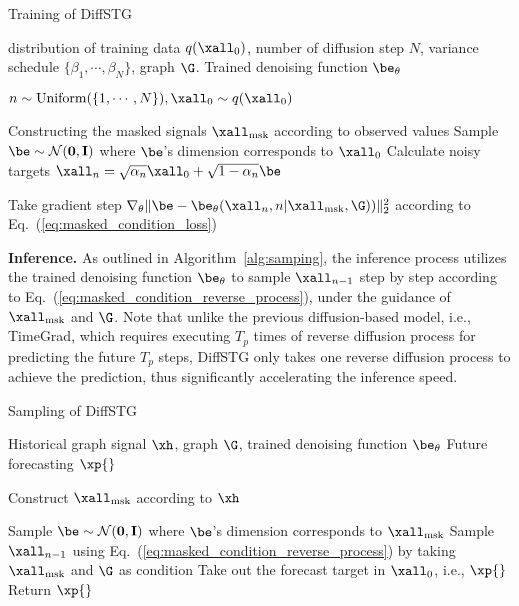 {  
\renewcommand{\algorithmicrequire}{\textbf{Input:}}  
\renewcommand{\algorithmicensure}{\textbf{Output:}} 
\begin{algorithm}[htbp]
   \caption{Training of DiffSTG}
   \small
\begin{algorithmic}[1]
   \Require distribution of training data $q(\xall_0)$, number of diffusion step $N$, variance schedule $\{\beta_1, \cdots, \beta_N \}$,  graph  $\G$.
   \Ensure Trained denoising function $\be_{\theta}$ 

   \Repeat
   \State $n \sim {\rm Uniform}(\{ 1, \cdots, N\}), \xall_{0} \sim q(\xall_0)$
   
    \State Constructing the masked signals $\xall_{\rm msk}$ according to observed values
   \State Sample $\be \sim {\mathcal{N}}(\mathbf{0}, \mathbf{I})$ where $\be$'s dimension corresponds to $\xall_{0}$
   \State Calculate noisy targets $\xall_{n}=\sqrt{\alpha_n}\xall_{0} + \sqrt{1 - \alpha_n }\be$

   \State Take gradient step  $\nabla_\theta  \| \be- \be_\theta(\xall_{n}, n | \xall_{\rm msk}, \G) )\|_2^2$ according to Eq.~(\ref{eq:masked_condition_loss})
\end{algorithmic}
\label{alg:training}
\end{algorithm}

\par \textbf{Inference.} As outlined in Algorithm~\ref{alg:samping}, the inference process  utilizes the trained denoising function $\be_{\theta}$ to sample $\xall_{n-1}$ step by step according to Eq.~(\ref{eq:masked_condition_reverse_process}), under the guidance of $\xall_{\rm msk}$ and $\G$. Note that unlike the previous diffusion-based model, i.e., TimeGrad, which requires executing $T_p$ times of reverse diffusion process for predicting the future $T_p$ steps,  DiffSTG only takes one reverse diffusion process to achieve the prediction, thus significantly accelerating the inference speed.

\begin{algorithm}[htbp]
    \caption{Sampling of DiffSTG}
    \small
    \begin{algorithmic}[1]
    \Require Historical graph signal $\xh$,  graph $\G$, trained denoising function $\be_{\theta}$
    \Ensure Future forecasting $\xp{}$

    \State Construct $\xall_{\rm msk}$ according to $\xh$

    \State Sample $\be \sim {\mathcal{N}}(\mathbf{0}, \mathbf{I})$ where $\be$'s dimension corresponds to $\xall_{\rm msk}$
        \State Sample $\xall_{n-1}$ using Eq.~(\ref{eq:masked_condition_reverse_process}) by taking $\xall_{\rm msk}$ and $\G$ as condition
    \EndFor
   \State Take out the forecast target in $\xall_{0}$, i.e., $\xp{}$
    \State Return $\xp{}$
    \end{algorithmic}
    \label{alg:samping}
  

\end{algorithm}}
